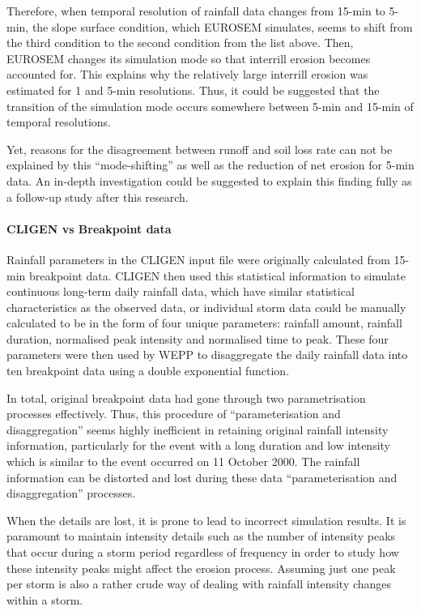 Therefore, when temporal resolution of rainfall data changes from 15-min to
5-min, the slope surface condition, which EUROSEM simulates, seems to shift from
the third condition to the second condition from the list above. Then, EUROSEM
changes its simulation mode so that interrill erosion becomes accounted for.
This explains why the relatively large interrill erosion was estimated for 1 and
5-min resolutions. Thus, it could be suggested that the transition of the
simulation mode occurs somewhere between 5-min and 15-min of temporal
resolutions.

Yet, reasons for the disagreement between runoff and soil loss rate can
not be explained by this ``mode-shifting'' as well as the reduction of net
erosion for 5-min data. An in-depth investigation could be suggested to explain
this finding fully as a follow-up study after this research.

\paragraph{CLIGEN vs Breakpoint data} Rainfall parameters in the CLIGEN
input file were originally calculated from 15-min breakpoint data. CLIGEN then
used this statistical information to simulate continuous long-term daily
rainfall data, which have similar statistical characteristics as the observed
data, or individual storm data could be manually calculated to be in the form of
four unique parameters: rainfall amount, rainfall duration, normalised peak
intensity and normalised time to peak. These four parameters were then used by
WEPP to disaggregate the daily rainfall data into ten breakpoint data using a
double exponential function.

In total, original breakpoint data had gone through two parametrisation
processes effectively. Thus, this procedure of ``parameterisation and
disaggregation'' seems highly inefficient in retaining original rainfall
intensity information, particularly for the event with a long duration and low
intensity which is similar to the event occurred on 11 October 2000. The
rainfall information can be distorted and lost during these data
``parameterisation and disaggregation'' processes.

When the details are lost, it is prone to lead to incorrect simulation results.
It is paramount to maintain intensity details such as the number of intensity
peaks that occur during a storm period regardless of frequency in order to study
how these intensity peaks might affect the erosion process. Assuming just one
peak per storm is also a rather crude way of dealing with rainfall intensity
changes within a storm.

